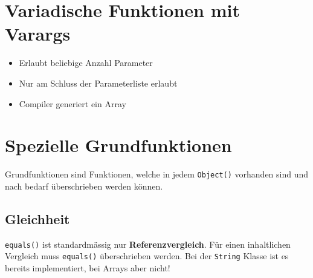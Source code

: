 \section*{Variadische Funktionen mit Varargs}
	\begin{minipage}[t]{7.3cm}
		\begin{itemize}[noitemsep]
			\item Erlaubt beliebige Anzahl Parameter
			\item Nur am Schluss der Parameterliste erlaubt
			\item Compiler generiert ein Array
	\end{itemize}
	
	\end{minipage}
	\hspace*{0.5cm}
	\begin{minipage}[t]{11cm}
		\vspace*{-0.2cm}
		
	\end{minipage}
\newpage
\section*{Spezielle Grundfunktionen}
Grundfunktionen sind Funktionen, welche in jedem \texttt{Object()} vorhanden sind und nach bedarf überschrieben werden können.
	\subsection*{Gleichheit}
		\texttt{equals()} ist standardmässig nur \textbf{Referenzvergleich}. Für einen inhaltlichen Vergleich muss \texttt{equals()} überschrieben werden. Bei der \texttt{String} Klasse ist es bereits implementiert, bei Arrays aber nicht!
	
